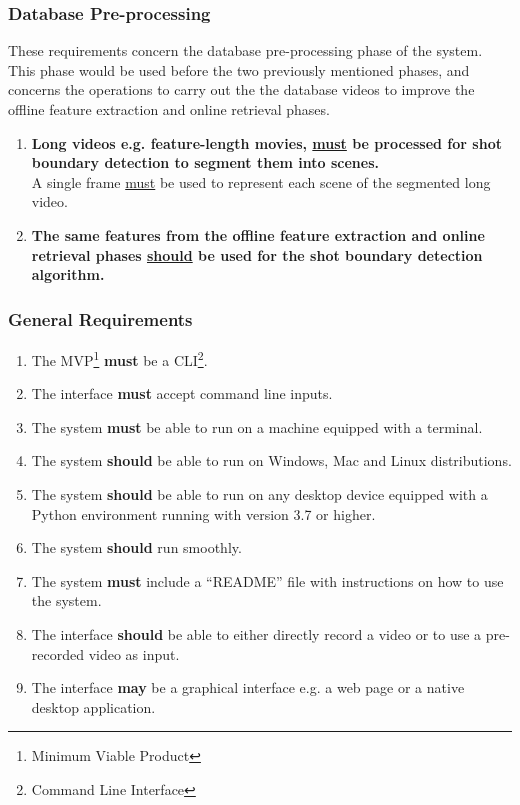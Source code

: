 \subsubsection{Database Pre-processing}

These requirements concern the database pre-processing phase of the system. This phase would be used before the two previously mentioned phases, and concerns the operations to carry out the the database videos to improve the offline feature extraction and online retrieval phases.

\begin{enumerate}
    \item \textbf{Long videos e.g. feature-length movies, \underline{must} be processed for shot boundary detection to segment them into scenes.}\\
    A single frame \underline{must} be used to represent each scene of the segmented long video.
    
    \item \textbf{The same features from the offline feature extraction and online retrieval phases \underline{should} be used for the shot boundary detection algorithm.}
\end{enumerate}

\subsubsection{General Requirements}

\begin{enumerate}
    \item The MVP\footnote{Minimum Viable Product} \textbf{must} be a CLI\footnote{Command Line Interface}.
    \item The interface \textbf{must} accept command line inputs.
    \item The system \textbf{must} be able to run on a machine equipped with a terminal.
    \item The system \textbf{should} be able to run on Windows, Mac and Linux distributions.
    \item The system \textbf{should} be able to run on any desktop device equipped with a Python environment running with version 3.7 or higher.
    \item The system \textbf{should} run smoothly.
    \item The system \textbf{must} include a ``README'' file with instructions on how to use the system.
    \item The interface \textbf{should} be able to either directly record a video or to use a pre-recorded video as input.
    \item The interface \textbf{may} be a graphical interface e.g. a web page or a native desktop application.
\end{enumerate}

